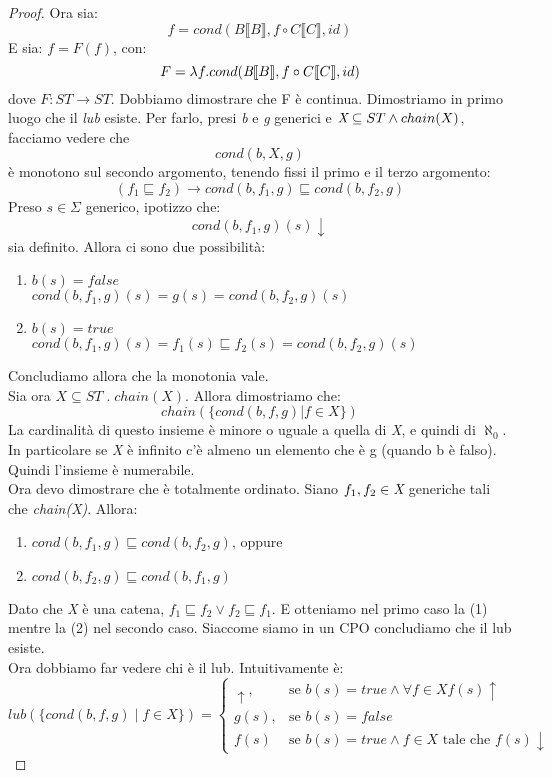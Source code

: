 \documentclass[a4paper, 10pt]{article} %
\begin{document}
\begin{proof}
  Ora sia:
  $$ f = cond(B \llbracket B \rrbracket , f \circ C \llbracket C \rrbracket , id) $$
  E sia:
  $ f = F(f) $, con:
  $$ F = \lambda f . cond(\emph{B} \llbracket B \rrbracket , f \circ C \llbracket C \rrbracket , id) $$
  dove $ F: ST \rightarrow ST $. Dobbiamo dimostrare che F è continua. Dimostriamo in primo luogo che il \emph{lub} esiste. Per farlo, presi \emph{b} e \emph{g} generici e $ \emph{X} \subseteq ST \land chain(X) $, facciamo vedere che $$ cond(b,X,g) $$ è monotono sul secondo argomento, tenendo fissi il primo e il terzo argomento:
  $$ (f_1 \sqsubseteq f_2) \rightarrow cond(b,f_{1},g) \sqsubseteq cond(b,f_{2},g) $$
  Preso $s \in \Sigma $ generico, ipotizzo che:
  $$ cond(b,f_1,g)(s) \downarrow $$
  sia definito. Allora ci sono due possibilità:
  \begin{enumerate}
  \item $ b(s) = false $ \\
    $ cond(b,f_1,g)(s)=g(s)=cond(b,f_2,g)(s) $
  \item $ b(s) = true $ \\
    $ cond(b,f_1,g)(s) = f_{1}(s) \sqsubseteq f_{2}(s) = cond(b,f_2,g)(s) $
  \end{enumerate}
  Concludiamo allora che la monotonia vale. \\
  Sia ora $ X \subseteq ST \; . \; chain(X) $. Allora dimostriamo che:
  $$ chain( \{cond(b,f,g) | f \in X\}) $$
  La cardinalità di questo insieme è minore o uguale a quella di \emph{X}, e quindi di $ \aleph_0 $. In particolare se \emph{X} è infinito c'è almeno un elemento che è g (quando b è falso). Quindi l'insieme è numerabile. \\ Ora devo dimostrare che è totalmente ordinato. Siano $f_1,f_2 \in \emph{X}$ generiche tali che \emph{chain(X)}. Allora:
  \begin{enumerate}
  \item $cond(b,f_1,g) \sqsubseteq cond(b,f_2,g)$, oppure
  \item $cond(b,f_2,g) \sqsubseteq cond(b,f_1,g)$
  \end{enumerate}
  Dato che \emph{X} è una catena, $f_1 \sqsubseteq f_2 \vee f_2 \sqsubseteq f_1 $. E otteniamo nel primo caso la (1) mentre la (2) nel secondo caso. Siaccome siamo in un CPO concludiamo che il lub esiste. \\
  Ora dobbiamo far vedere chi è il lub. Intuitivamente è:
  $$ lub( \{ cond(b,f,g) \; | \; f \in X \})= \begin{cases} \uparrow , & \mbox{se } b(s)=true \land \forall f \in X f(s) \uparrow \; \\ g(s), & \mbox{se } b(s)=false \; \\ f(s) & \mbox{se } b(s)=true \land f \in X \mbox{ tale che } f(s) \downarrow 

\end{cases}$$
\end{proof}
\end{document}
